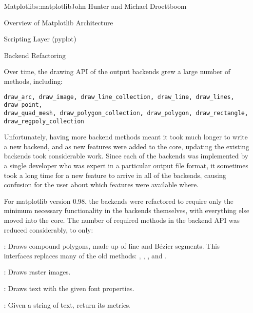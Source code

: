 \begin{aosachapter}{Matplotlib}{s:matplotlib}{John Hunter and Michael Droettboom}
\begin{aosasect1}{Overview of Matplotlib Architecture}
\begin{aosasect2}{Scripting Layer (pyplot)}
\end{aosasect2}

\end{aosasect1}

\begin{aosasect1}{Backend Refactoring}


Over time, the drawing API of the output backends grew a large number
of methods, including:

\begin{verbatim}
draw_arc, draw_image, draw_line_collection, draw_line, draw_lines, draw_point,
draw_quad_mesh, draw_polygon_collection, draw_polygon, draw_rectangle,
draw_regpoly_collection
\end{verbatim}

Unfortunately, having more backend methods meant it took much longer
to write a new backend, and as new features were added to the core,
updating the existing backends took considerable work.  Since each of
the backends was implemented by a single developer who was expert in a
particular output file format, it sometimes took a long time for a new
feature to arrive in all of the backends, causing confusion for the
user about which features were available where.

For matplotlib version 0.98, the backends were refactored to require
only the minimum necessary functionality in the backends themselves,
with everything else moved into the core.  The number of required
methods in the backend API was reduced considerably, to only:

\begin{aosaitemize}

  \item {}: Draws compound polygons, made up of line and
    B\'ezier segments.  This interfaces replaces many of the old
    methods: , , ,
    and .

  \item {}: Draws raster images.

  \item {}: Draws text with the given font properties.

  \item {}: Given a string of
    text, return its metrics.

\end{aosaitemize}


\end{aosasect1}
\end{aosachapter}
